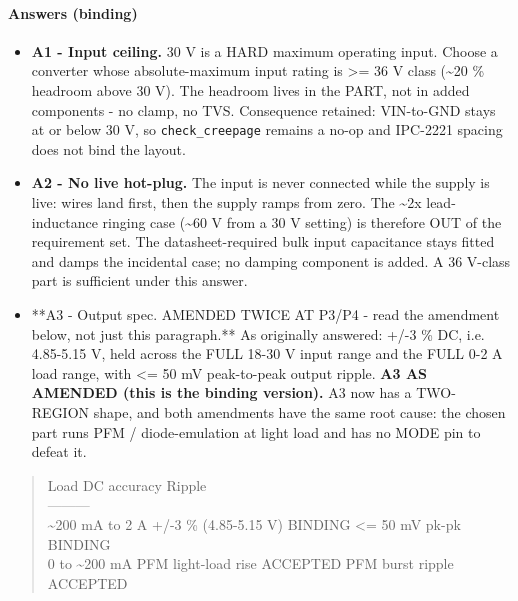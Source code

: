 \documentclass[11pt,a4paper]{article}
\begin{document}
\paragraph*{Answers (binding)}
\begin{itemize}
\item \textbf{A1 - Input ceiling.} 30 V is a HARD maximum operating input. Choose a
converter whose absolute-maximum input rating is \textgreater{}= 36 V class (\textasciitilde{}20 \%
headroom above 30 V). The headroom lives in the PART, not in added
components - no clamp, no TVS. Consequence retained: VIN-to-GND stays at
or below 30 V, so \texttt{check\_creepage} remains a no-op and IPC-2221 spacing
does not bind the layout.
\item \textbf{A2 - No live hot-plug.} The input is never connected while the supply
is live: wires land first, then the supply ramps from zero. The \textasciitilde{}2x
lead-inductance ringing case (\textasciitilde{}60 V from a 30 V setting) is therefore OUT
of the requirement set. The datasheet-required bulk input capacitance
stays fitted and damps the incidental case; no damping component is
added. A 36 V-class part is sufficient under this answer.
\item {*}{*}A3 - Output spec. AMENDED TWICE AT P3/P4 - read the amendment below, not
just this paragraph.{*}{*} As originally answered: +/-3 \% DC, i.e. 4.85-5.15 V,
held across the FULL 18-30 V input range and the FULL 0-2 A load range,
with \textless{}= 50 mV peak-to-peak output ripple.
\textbf{A3 AS AMENDED (this is the binding version).} A3 now has a TWO-REGION
shape, and both amendments have the same root cause: the chosen part runs
PFM / diode-emulation at light load and has no MODE pin to defeat it.
\end{itemize}
\begin{quote}\small\ttfamily\raggedright
  \textbar{} Load \textbar{} DC accuracy \textbar{} Ripple \textbar{}\\
  \textbar{}---\textbar{}---\textbar{}---\textbar{}\\
  \textbar{} \textasciitilde{}200 mA to 2 A \textbar{} +/-3 \% (4.85-5.15 V) BINDING \textbar{} \textless{}= 50 mV pk-pk BINDING \textbar{}\\
  \textbar{} 0 to \textasciitilde{}200 mA \textbar{} PFM light-load rise ACCEPTED \textbar{} PFM burst ripple ACCEPTED \textbar{}
\end{quote}
\end{document}
